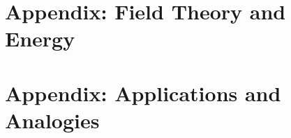 \documentclass[11pt,openright,twoside]{book}
\begin{document}
\part{Appendix: Field Theory and Energy}



\part{Appendix: Applications and Analogies}



\end{document}
